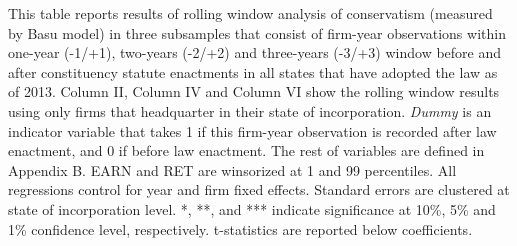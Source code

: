 \begin{landscape}
	\noindent This table reports results of rolling window analysis of conservatism (measured by Basu model) in three subsamples that consist of firm-year observations within one-year (-1/+1), two-years (-2/+2) and three-years (-3/+3) window before and after constituency statute enactments in all states that have adopted the law as of 2013. Column II, Column IV and Column VI show the rolling window results using only firms that headquarter in their state of incorporation. \textit{Dummy} is an indicator variable that takes 1 if this firm-year observation is recorded after law enactment, and 0 if before law enactment. The rest of variables are defined in Appendix B. EARN and RET are winsorized at 1 and 99 percentiles. All regressions control for year and firm fixed effects. Standard errors are clustered at state of incorporation level. *, **, and *** indicate significance at 10\%, 5\% and 1\% confidence level, respectively. t-statistics are reported below coefficients.
\end{landscape}

